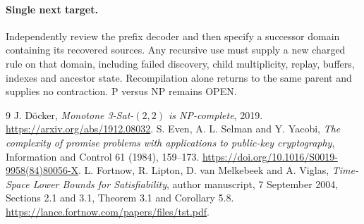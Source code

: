 \documentclass[11pt]{article}
\begin{document}
\paragraph{Single next target.}
Independently review the prefix decoder and then specify a successor domain
containing its recovered sources. Any recursive use must supply a new charged
rule on that domain, including failed discovery, child multiplicity, replay,
buffers, indexes and ancestor state. Recompilation alone returns to the same
parent and supplies no contraction. P versus NP remains OPEN.

\begin{thebibliography}{9}
 J. D\"ocker, \emph{Monotone 3-Sat-$(2,2)$ is NP-complete},
2019. \url{https://arxiv.org/abs/1912.08032}.
 S. Even, A. L. Selman and Y. Yacobi,
\emph{The complexity of promise problems with applications to public-key
cryptography}, Information and Control 61 (1984), 159--173.
\url{https://doi.org/10.1016/S0019-9958(84)80056-X}.
 L. Fortnow, R. Lipton, D. van Melkebeek and A. Viglas,
\emph{Time-Space Lower Bounds for Satisfiability}, author manuscript,
7 September 2004, Sections 2.1 and 3.1, Theorem 3.1 and Corollary 5.8.
\url{https://lance.fortnow.com/papers/files/tst.pdf}.
\end{thebibliography}
\end{document}
